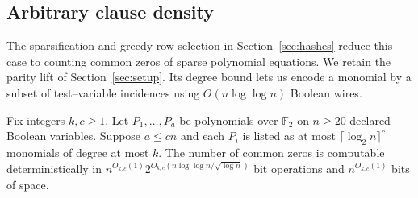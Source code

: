 \subsection{Arbitrary clause density}\label{subsec:sharp-dense}

The sparsification and greedy row selection in Section~\ref{sec:hashes}
reduce this case to counting common zeros of sparse polynomial equations.
We retain the parity lift of Section~\ref{sec:setup}. Its degree bound
lets us encode a monomial by a subset of test--variable incidences using
$O(n\log\log n)$ Boolean wires.

\begin{lemma}
\label{lem:tensor-sparse-query}
Fix integers $k,c\ge1$. Let $P_1,\ldots,P_a$ be polynomials over
$\mathbb F_2$ on $n\ge20$ declared Boolean variables. Suppose
$a\le cn$ and each $P_i$ is listed as at most
$\lceil\log_2 n\rceil^c$ monomials of degree at most $k$. The number
of common zeros is computable deterministically in
$n^{O_{k,c}(1)}2^{O_{k,c}(n\log\log n/\sqrt{\log n})}$ bit operations and
$n^{O_{k,c}(1)}$ bits of space.
\end{lemma}

